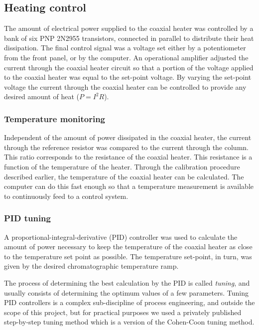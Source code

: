 \subsection{Heating control}

The amount of electrical power supplied to the coaxial heater was controlled by
a bank of six PNP 2N2955 transistors, connected in parallel to distribute their
heat dissipation. The final control signal was a voltage set either by a
potentiometer from the front panel, or by the computer. An operational amplifier
adjusted the current through the coaxial heater circuit so that a portion of the
voltage applied to the coaxial heater was equal to the set-point voltage. By
varying the set-point voltage the current through the coaxial heater can be
controlled to provide any desired amount of heat (\(P = I^2R\)).

\subsubsection{Temperature monitoring}

Independent of the amount of power dissipated in the coaxial heater, the current
through the reference resistor was compared to the current through the column.
This ratio corresponds to the resistance of the coaxial heater. This resistance
is a function of the temperature of the heater. Through the calibration
procedure described earlier, the temperature of the coaxial heater can be
calculated. The computer can do this fast enough so that a temperature
measurement is available to continuously feed to a control system. 

\subsubsection{PID tuning}

A proportional-integral-derivative (PID) controller was used to calculate the
amount of power necessary to keep the temperature of the coaxial heater as close
to the temperature set point as possible. The temperature set-point, in turn,
was given by the desired chromatographic temperature ramp.

The process of determining the best calculation by the PID is called
\textit{tuning}, and usually consists of determining the optimum values of a few
parameters. Tuning PID controllers is a complex sub-discipline of process
engineering, and outside the scope of this project, but for practical purposes
we used a privately published step-by-step tuning method \autocite{Peacock2008}
which is a version of the Cohen-Coon tuning method.

